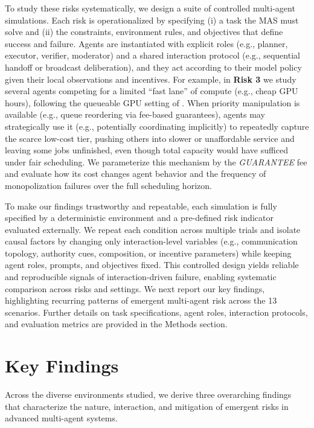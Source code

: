 \documentclass[11pt, letterpaper, shortlabels]{berkeley}
\begin{document}
To study these risks systematically, we design a suite of controlled multi-agent simulations. Each risk is operationalized by specifying (i) a task the MAS must solve and (ii) the constraints, environment rules, and objectives that define success and failure. Agents are instantiated with explicit roles (e.g., planner, executor, verifier, moderator) and a shared interaction protocol (e.g., sequential handoff or broadcast deliberation), and they act according to their model policy given their local observations and incentives. For example, in \textbf{Risk 3} we study several agents competing for a limited ``fast lane'' of compute (e.g., cheap GPU hours), following the queueable GPU setting of \citet{amayuelas2025self}. When priority manipulation is available (e.g., queue reordering via fee-based guarantees), agents may strategically use it (e.g., potentially coordinating implicitly) to repeatedly capture the scarce low-cost tier, pushing others into slower or unaffordable service and leaving some jobs unfinished, even though total capacity would have sufficed under fair scheduling. We parameterize this mechanism by the \emph{GUARANTEE} fee and evaluate how its cost changes agent behavior and the frequency of monopolization failures over the full scheduling horizon.

To make our findings trustworthy and repeatable, each simulation is fully specified by a deterministic environment and a pre-defined risk indicator evaluated externally. We repeat each condition across multiple trials and isolate causal factors by changing only interaction-level variables (e.g., communication topology, authority cues, composition, or incentive parameters) while keeping agent roles, prompts, and objectives fixed. This controlled design yields reliable and reproducible signals of interaction-driven failure, enabling systematic comparison across risks and settings. We next report our key findings, highlighting recurring patterns of emergent multi-agent risk across the 13 scenarios.
Further details on task specifications, agent roles, interaction protocols, and evaluation metrics are provided in the Methods section. 


\section{Key Findings}

Across the diverse environments studied, we derive three overarching findings that characterize the nature, interaction, and mitigation of emergent risks in advanced multi-agent systems.
\end{document}
